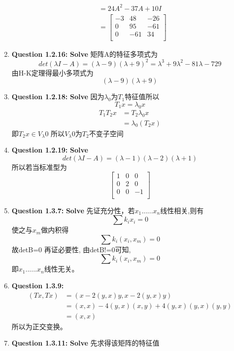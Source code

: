 \documentclass[UTF8]{uofa-eng-assignment}
\begin{document}
\begin{enumerate}
$$\begin{aligned}
    &=24A^2-37A+10I\\
    &=\left[
        \begin{matrix}
            -3&48&-26\\
            0&95&-61\\
            0&-61&34\\
        \end{matrix}\right]
\end{aligned}    
$$
\item \textbf{Question 1.2.16:}
\textbf{Solve}
矩阵A的特征多项式为
$$det(\lambda I-A)=(\lambda-9)(\lambda+9)^2=\lambda^3+9\lambda^2-81\lambda-729$$
由H-K定理得最小多项式为
$$(\lambda-9)(\lambda+9)$$
\item \textbf{Question 1.2.18:}
\textbf{Solve}
因为$\lambda_0$为$T_1$特征值所以
$$T_1x=\lambda_0 x $$
$$
\begin{aligned}
    T_1T_2x&=T_2 \lambda_0 x\\
    &=\lambda_0(T_2x)
\end{aligned}
$$
即$T_2x \in V_\lambda0$
所以$V_\lambda0$为$T_2$不变子空间
\item \textbf{Question 1.2.19:}
\textbf{Solve}
$$det(\lambda I-A)=(\lambda-1)(\lambda-2)(\lambda+1)$$
所以若当标准型为
$$
\left[
        \begin{matrix}
            1&0&0\\
            0&2&0\\
            0&0&-1\\
        \end{matrix}\right]
$$
\item \textbf{Question 1.3.7:}
\textbf{Solve}
先证充分性，若$x_1......x_n$线性相关,则有
$$\sum{k_ix_i}=0$$
使之与$x_m$做内积得
$$\sum{k_i(x_i,x_m)}=0$$
故detB=0
再证必要性,
由detB!=0可知,
$$\sum{k_i(x_i,x_m)}=0$$
即$x_1......x_n$线性无关。
\item \textbf{Question 1.3.9:}
$$
\begin{aligned}
    (Tx,Tx)&=(x-2(y,x)y,x-2(y,x)y)\\
    &=(x,x)-4(y,x)(x,y)+4(y,x)(y,x)(y,y)\\
    &=(x,x)
\end{aligned}
$$
所以为正交变换。
\item \textbf{Question 1.3.11:}
\textbf{Solve}
先求得该矩阵的特征值

\end{enumerate}
\end{document}
